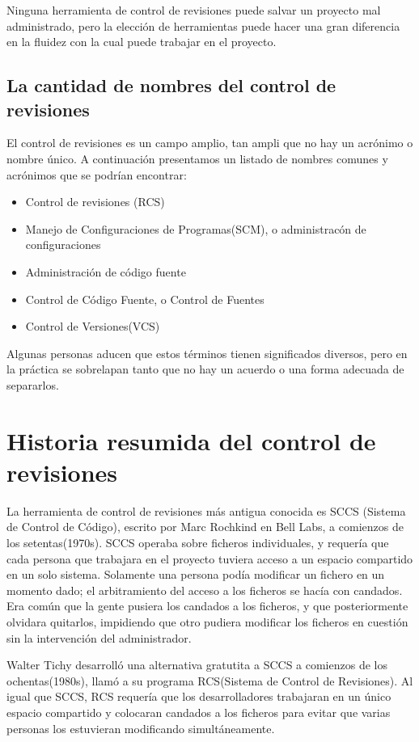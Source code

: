 Ninguna herramienta de control de revisiones puede salvar un
proyecto mal administrado, pero la elección de herramientas puede
hacer una gran diferencia en la fluidez con la cual puede trabajar en
el proyecto.

\subsection{La cantidad de nombres del control de revisiones}

El control de revisiones es un campo amplio, tan ampli que no hay un
acrónimo o nombre único. A continuación presentamos un listado de
nombres comunes y acrónimos que se podrían encontrar:
\begin{itemize}
\item Control de revisiones (RCS)
\item Manejo de Configuraciones de Programas(SCM), o administracón de
  configuraciones
\item Administración de código fuente
\item Control de Código Fuente, o Control de Fuentes
\item Control de Versiones(VCS)
\end{itemize}
Algunas personas aducen que estos términos tienen significados
diversos, pero en la práctica se sobrelapan tanto que no hay un
acuerdo o una forma adecuada de separarlos.

\section{Historia resumida del control de revisiones}

La herramienta de control de revisiones más antigua conocida es SCCS 
(Sistema de Control de Código), escrito por Marc Rochkind en Bell
Labs, a comienzos de los setentas(1970s).  SCCS operaba sobre ficheros
individuales, y requería que cada persona que trabajara en el proyecto
tuviera acceso a un espacio compartido en un solo sistema.  Solamente
una persona podía modificar un fichero en un momento dado; el
arbitramiento del acceso a los ficheros se hacía con candados. Era
común que la gente pusiera los candados a los ficheros, y que
posteriormente olvidara quitarlos, impidiendo que otro pudiera
modificar los ficheros en cuestión sin la intervención del
administrador.

Walter Tichy desarrolló una alternativa gratutita a SCCS a comienzos
de los ochentas(1980s), llamó a su programa RCS(Sistema de Control de
Revisiones).  Al igual que SCCS, RCS requería que los desarrolladores
trabajaran en un único espacio compartido y colocaran candados a los
ficheros para evitar que varias personas los estuvieran modificando
simultáneamente.

